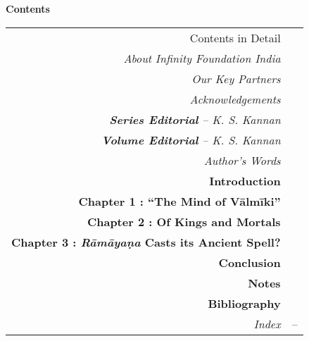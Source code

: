 \thispagestyle{empty}


\hfill{\LARGE\bfseries Contents}
\vskip 20pt

{\renewcommand{\arraystretch}{1.15}
\begin{longtable}[r]{rl@{}}
{{Contents in Detail}} & \pageref{cid}\\[7pt]
{{\sl About Infinity Foundation India}} & \pageref{about}\\[7pt]
{{\sl Our Key Partners}} & \pageref{keypartners}\\[7pt]
{{\sl Acknowledgements}} & \pageref{ack2}\\[7pt]
{{\sl{\bfseries Series Editorial}  – K. S. Kannan}} & \pageref{series_editorial}\\[7pt]
{{\sl{\bfseries Volume Editorial}  – K. S. Kannan}} & \pageref{volume_editorial}\\[7pt]
{{\sl Author's Words}} & \pageref{authors-words}\\[7pt]
{{\bf Introduction}} & \pageref{introduction}\\[7pt]
{{\bfseries Chapter 1 : “The Mind of Vālmīki”}} & \pageref{chapter1}\\[7pt]
{{\bfseries Chapter 2 : Of Kings and Mortals}} & \pageref{chapter2}\\[7pt]
{{\bfseries Chapter 3 : {\sl\bfseries Rāmāyaṇa} Casts its Ancient Spell?}} & \pageref{chapter3}\\[7pt]
{{\bf Conclusion}} & \pageref{conclusion}\\[7pt]
{{\bf Notes}} & \pageref{notes}\\[7pt]
{{\bf Bibliography}} & \pageref{bibliography}\\[7pt]
{{\sl Index}} & \pageref{begin:index}--\pageref{bookend}
\end{longtable}}
